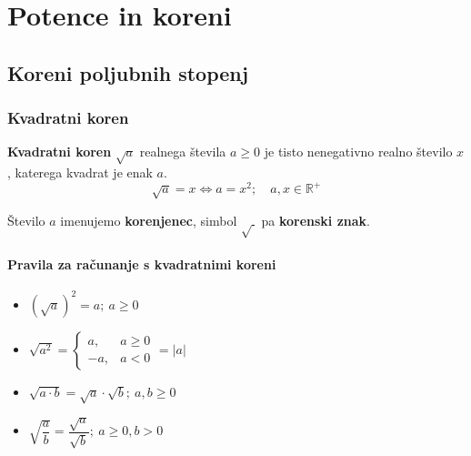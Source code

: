 \chapter{Potence in koreni}




    \section{Koreni poljubnih stopenj}

        
            \subsection{Kvadratni koren}

                \textbf{Kvadratni koren} $\sqrt{a}$ realnega števila $a\geq 0$ je tisto nenegativno realno število $x$,
                katerega kvadrat je enak $a$.
                $$\sqrt{a}=x \Leftrightarrow a=x^2; \quad a,x\in\mathbb{R}^+ $$

                Število $a$ imenujemo \textbf{korenjenec}, simbol $\sqrt{~}$ pa \textbf{korenski znak}.
            

            \subsubsection*{Pravila za računanje s kvadratnimi koreni}
                    \begin{multicols}{2}
                        \begin{itemize}
                            \item $\left(\sqrt{a}\right)^2=a; ~a\geq 0$
                            \item $\sqrt{a^2}=\begin{cases}
                                a, & a\geq 0 \\
                                -a, & a<0
                            \end{cases}=\lvert a\rvert$
                            \item $\sqrt{a\cdot b}=\sqrt{a}\cdot\sqrt{b}; ~a,b\geq 0$
                            \item $\sqrt{\dfrac{a}{b}}=\dfrac{\sqrt{a}}{\sqrt{b}}; ~a\geq 0, b>0$
                        \end{itemize}
                    \end{multicols}
                    
            

